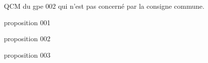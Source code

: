 \begin{exercice}
    QCM du gpe 002 qui n'est pas concerné par la consigne commune.
    \begin{ChoixQCM}{3}
    \item proposition 001
    \item proposition 002
    \item proposition 003
    \end{ChoixQCM}
\end{exercice}
\begin{corrige}
\end{corrige}